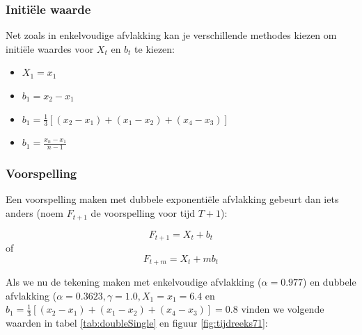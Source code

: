 \subsubsection{Initiële waarde}

Net zoals in enkelvoudige afvlakking kan je verschillende methodes kiezen om initiële waardes voor $X_{t}$ en $b_{t}$ te kiezen:

\begin{itemize}
	\item $X_{1} = x_{1}$
	\item $b_{1} = x_{2} - x_{1}$
	\item $b_{1} = \frac{1}{3}\left[ (x_{2} - x_{1}) + (x_{1} - x_{2}) + (x_{4} - x_{3}) \right]$
	\item $b_{1} = \frac{x_{n} - x_{1}}{n-1}$
\end{itemize}

\subsubsection{Voorspelling}

Een voorspelling maken met dubbele exponentiële afvlakking gebeurt dan iets anders (noem $F_{t+1}$ de voorspelling voor tijd $T+1$):

\[ F_{t+1} = X_{t} + b_{t} \]
of
\[ F_{t+m} = X_{t} + m b_{t} \]

Als we nu de tekening maken met enkelvoudige afvlakking ($\alpha = 0.977$) en dubbele afvlakking ($\alpha = 0.3623, \gamma = 1.0, X_{1} = x_{1} = 6.4$ en $b_{1} = \frac{1}{3}\left[ (x_{2} - x_{1}) + (x_{1} - x_{2}) + (x_{4} - x_{3}) \right] = 0.8$ vinden we volgende waarden in tabel \ref{tab:doubleSingle} en figuur \ref{fig:tijdreeks71}:

